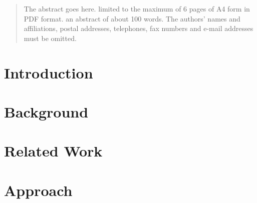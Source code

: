 \documentclass[conference]{IEEEtran}
\begin{document}
\maketitle

\begin{abstract}
The abstract goes here. limited to the maximum of 6 pages of A4 form in PDF format. an abstract of about 100 words. The authors’ names and affiliations, postal addresses, telephones, fax numbers and e-mail addresses must be omitted.
\end{abstract}





%
\IEEEpeerreviewmaketitle



\section{Introduction}

%


\section{Background}\label{Background}

%


\section{Related Work}\label{Related Work}

%


\section{Approach}\label{Approach}

%
\end{document}
